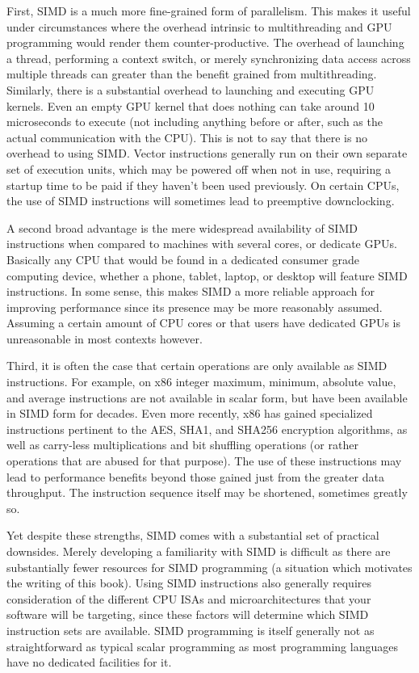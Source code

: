 First, SIMD is a much more fine-grained form of parallelism. This makes it
useful under circumstances where the overhead intrinsic to multithreading and
GPU programming would render them counter-productive. The overhead of launching
a thread, performing a context switch, or merely synchronizing data access
across multiple threads can greater than the benefit grained from
multithreading. Similarly, there is a substantial overhead to launching and
executing GPU kernels. Even an empty GPU kernel that does nothing can take
around 10 microseconds to execute (not including anything before or after, such
as the actual communication with the CPU). This is not to say that there is no
overhead to using SIMD. Vector instructions generally run on their own separate
set of execution units, which may be powered off when not in use, requiring a
startup time to be paid if they haven't been used previously. On certain CPUs,
the use of SIMD instructions will sometimes lead to preemptive downclocking.

A second broad advantage is the mere widespread availability of SIMD
instructions when compared to machines with several cores, or dedicate GPUs.
Basically any CPU that would be found in a dedicated consumer grade computing
device, whether a phone, tablet, laptop, or desktop will feature SIMD
instructions. In some sense, this makes SIMD a more reliable approach for
improving performance since its presence may be more reasonably assumed.
Assuming a certain amount of CPU cores or that users have dedicated GPUs is
unreasonable in most contexts however. 

Third, it is often the case that certain operations are only available as SIMD
instructions. For example, on x86 integer maximum, minimum, absolute value, and
average instructions are not available in scalar form, but have been available
in SIMD form for decades. Even more recently, x86 has gained specialized
instructions pertinent to the AES, SHA1, and SHA256 encryption algorithms, as
well as carry-less multiplications and bit shuffling operations (or rather
operations that are abused for that purpose). The use of these instructions may
lead to performance benefits beyond those gained just from the greater data
throughput. The instruction sequence itself may be shortened, sometimes greatly
so.

Yet despite these strengths, SIMD comes with a substantial set of practical
downsides. Merely developing a familiarity with SIMD is difficult as there are
substantially fewer resources for SIMD programming (a situation which motivates
the writing of this book). Using SIMD instructions also generally requires
consideration of the different CPU ISAs and microarchitectures that your
software will be targeting, since these factors will determine which SIMD
instruction sets are available. SIMD programming is itself generally not as
straightforward as typical scalar programming as most programming languages have
no dedicated facilities for it. 

